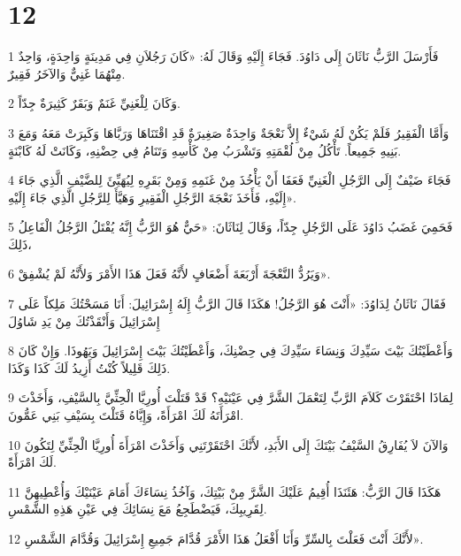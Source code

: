 \chapter{12}

\par 1 فَأَرْسَلَ الرَّبُّ نَاثَانَ إِلَى دَاوُدَ. فَجَاءَ إِلَيْهِ وَقَالَ لَهُ: «كَانَ رَجُلاَنِ فِي مَدِينَةٍ وَاحِدَةٍ، وَاحِدٌ مِنْهُمَا غَنِيٌّ وَالآخَرُ فَقِيرٌ.
\par 2 وَكَانَ لِلْغَنِيِّ غَنَمٌ وَبَقَرٌ كَثِيرَةٌ جِدّاً.
\par 3 وَأَمَّا الْفَقِيرُ فَلَمْ يَكُنْ لَهُ شَيْءٌ إِلاَّ نَعْجَةٌ وَاحِدَةٌ صَغِيرَةٌ قَدِ اقْتَنَاهَا وَرَبَّاهَا وَكَبِرَتْ مَعَهُ وَمَعَ بَنِيهِ جَمِيعاً. تَأْكُلُ مِنْ لُقْمَتِهِ وَتَشْرَبُ مِنْ كَأْسِهِ وَتَنَامُ فِي حِضْنِهِ، وَكَانَتْ لَهُ كَابْنَةٍ.
\par 4 فَجَاءَ ضَيْفٌ إِلَى الرَّجُلِ الْغَنِيِّ فَعَفَا أَنْ يَأْخُذَ مِنْ غَنَمِهِ وَمِنْ بَقَرِهِ لِيُهَيِّئَ لِلضَّيْفِ الَّذِي جَاءَ إِلَيْهِ، فَأَخَذَ نَعْجَةَ الرَّجُلِ الْفَقِيرِ وَهَيَّأَ لِلرَّجُلِ الَّذِي جَاءَ إِلَيْهِ».
\par 5 فَحَمِيَ غَضَبُ دَاوُدَ عَلَى الرَّجُلِ جِدّاً، وَقَالَ لِنَاثَانَ: «حَيٌّ هُوَ الرَّبُّ إِنَّهُ يُقْتَلُ الرَّجُلُ الْفَاعِلُ ذَلِكَ،
\par 6 وَيَرُدُّ النَّعْجَةَ أَرْبَعَةَ أَضْعَافٍ لأَنَّهُ فَعَلَ هَذَا الأَمْرَ وَلأَنَّهُ لَمْ يُشْفِقْ».
\par 7 فَقَالَ نَاثَانُ لِدَاوُدَ: «أَنْتَ هُوَ الرَّجُلُ! هَكَذَا قَالَ الرَّبُّ إِلَهُ إِسْرَائِيلَ: أَنَا مَسَحْتُكَ مَلِكاً عَلَى إِسْرَائِيلَ وَأَنْقَذْتُكَ مِنْ يَدِ شَاوُلَ
\par 8 وَأَعْطَيْتُكَ بَيْتَ سَيِّدِكَ وَنِسَاءَ سَيِّدِكَ فِي حِضْنِكَ، وَأَعْطَيْتُكَ بَيْتَ إِسْرَائِيلَ وَيَهُوذَا. وَإِنْ كَانَ ذَلِكَ قَلِيلاً كُنْتُ أَزِيدُ لَكَ كَذَا وَكَذَا.
\par 9 لِمَاذَا احْتَقَرْتَ كَلاَمَ الرَّبِّ لِتَعْمَلَ الشَّرَّ فِي عَيْنَيْهِ؟ قَدْ قَتَلْتَ أُورِيَّا الْحِثِّيَّ بِالسَّيْفِ، وَأَخَذْتَ امْرَأَتَهُ لَكَ امْرَأَةً، وَإِيَّاهُ قَتَلْتَ بِسَيْفِ بَنِي عَمُّونَ.
\par 10 وَالآنَ لاَ يُفَارِقُ السَّيْفُ بَيْتَكَ إِلَى الأَبَدِ، لأَنَّكَ احْتَقَرْتَنِي وَأَخَذْتَ امْرَأَةَ أُورِيَّا الْحِثِّيِّ لِتَكُونَ لَكَ امْرَأَةً.
\par 11 هَكَذَا قَالَ الرَّبُّ: هَئَنَذَا أُقِيمُ عَلَيْكَ الشَّرَّ مِنْ بَيْتِكَ، وَآخُذُ نِسَاءَكَ أَمَامَ عَيْنَيْكَ وَأُعْطِيهِنَّ لِقَرِيبِكَ، فَيَضْطَجِعُ مَعَ نِسَائِكَ فِي عَيْنِ هَذِهِ الشَّمْسِ.
\par 12 لأَنَّكَ أَنْتَ فَعَلْتَ بِالسِّرِّ وَأَنَا أَفْعَلُ هَذَا الأَمْرَ قُدَّامَ جَمِيعِ إِسْرَائِيلَ وَقُدَّامَ الشَّمْسِ».

